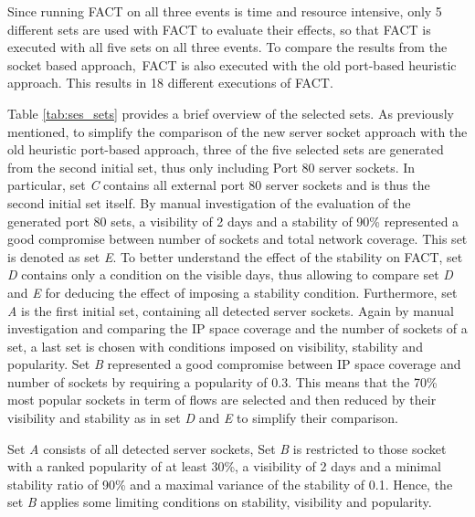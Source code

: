 Since running \gls{FACT} on all three events is time and resource intensive, only 5 different sets are used with \gls{FACT} to evaluate their effects, so that \gls{FACT} is executed with all five sets on all three events. To compare the results from the socket based approach, \gls{FACT} is also executed with the old port-based heuristic approach. This results in 18 different executions of \gls{FACT}.

Table \ref{tab:ses_sets} provides a brief overview of the selected sets.
As previously mentioned, to simplify the comparison of the new \gls{server socket} approach with the old heuristic port-based approach, three of the five selected sets are generated from the second initial set, thus only including Port 80 \glspl{server socket}. In particular, set \emph{C} contains all external port 80 \glspl{server socket} and is thus the second initial set itself. 
By manual investigation of the evaluation of the generated port 80 sets, a visibility of 2 days and a stability of 90\% represented a good compromise between number of sockets and total network coverage. 
This set is denoted as set \emph{E}. To better understand the effect of the stability on \gls{FACT}, set \emph{D} contains only a condition on the visible days, thus allowing to compare set \emph{D} and \emph{E} for deducing the effect of imposing a stability condition. 
Furthermore, set \emph{A} is the first initial set, containing all detected \glspl{server socket}. Again by manual investigation and comparing the IP space coverage and the number of sockets of a set, a last set is chosen with conditions imposed on visibility, stability and popularity. Set \emph{B} represented a good compromise between IP space coverage and number of sockets by requiring a popularity of 0.3. This means that the 70\% most popular sockets in term of flows are selected and then reduced by their visibility and stability as in set \emph{D} and \emph{E} to simplify their comparison. 


Set \emph{A} consists of all detected \glspl{server socket}, Set \emph{B} is restricted to those socket with a ranked popularity of at least 30\%, a visibility of 2 days and a minimal stability ratio of 90\% and a maximal variance of the stability of 0.1. 
Hence, the set \emph{B} applies some limiting conditions on stability, visibility and popularity. 

